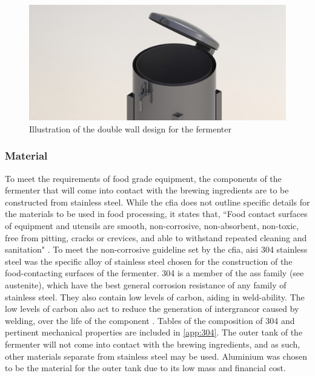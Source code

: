 \documentclass{article}
\begin{document}
\begin{figure}[H]
\begin{center}
\includegraphics[scale=0.20]{fermenter-wall-cad.png}
\caption{Illustration of the double wall design for the fermenter}
\label{fig:fermenter-wall-cad}
\end{center}
\end{figure}

\subsubsection{Material}
To meet the requirements of food grade equipment, the components of the fermenter that will come into contact with the brewing ingredients are to be constructed from stainless steel.  While the \gls{cfia} does not outline specific details for the materials to be used in food processing, it states that, ``Food contact surfaces of equipment and utensils are smooth, non-corrosive, non-absorbent, non-toxic, free from pitting, cracks or crevices, and able to withstand repeated cleaning and sanitation" \cite{food-grade}.
To meet the non-corrosive guideline set by the \gls{cfia}, \gls{aisi} 304 stainless steel was the specific alloy of stainless steel chosen for the construction of the food-contacting surfaces of the fermenter.  304 is a member of the \gls{ass} family (see \gls{austenite}), which have the best general corrosion resistance of any family of stainless steel.  They also contain low levels of carbon, aiding in weld-ability.  The low levels of carbon also act to reduce the generation of \gls{intergrancor} caused by welding, over the life of the component \cite{asme-eng}.  Tables of the composition of 304 and pertinent mechanical properties are included in \ref{app:304}. The outer tank of the fermenter will not come into contact with the brewing ingredients, and as such, other materials separate from stainless steel may be used.  Aluminium was chosen to be the material for the outer tank due to its low mass and financial cost.
\end{document}

